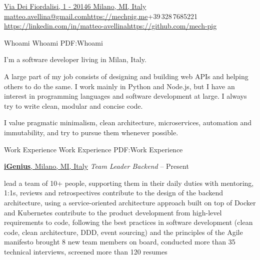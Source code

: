 \documentclass[a4paper,MMMyyyy,nonstopmode]{simpleresumecv}
\makeatletter
\renewcommand{\BulletSymbol}{{\normalfont\fontsize{6.5}{7.8}\selectfont\raisebox{0.17em}{\char"2022}}}
\newcommand{\CVAuthor}{Matteo Avellina}
\newcommand{\CVWebpage}{https://mechpig.me}
\newcommand{\CVGithub}{https://github.com/mech-pig}
\newcommand{\CVLinkedin}{https://linkedin.com/in/matteo-avellina}
\newcommand{\CVEmail}{matteo.avellina@gmail.com}
\newcommand{\CVMobile}{+39\,328\,7685221}
\makeatother
\begin{document}

  \Title{\CVAuthor}

  \begin{SubTitle}
    \href{https://www.google.com/maps/place/Via+dei+Fiordalisi,+1,+20146+Milano+MI}{Via Dei Fiordalisi, 1 - 20146 Milano, MI, Italy}
    \Gap
    \href{mailto:\CVEmail}{\CVEmail}\enspace\BulletSymbol\enspace\href{\CVWebpage}{\CVWebpage}\enspace\BulletSymbol\enspace\CVMobile
    \Gap
    \href{\CVLinkedin}{\CVLinkedin}\enspace\BulletSymbol\enspace\href{\CVGithub}{\CVGithub}
  \end{SubTitle}

  \begin{Body}

    \Section
    {Whoami}
    {Whoami}
    {PDF:Whoami}
    \begin{Detail}
      I'm a software developer living in Milan, Italy.
      \par
      A large part of my job consists of designing and building web APIs and helping others to do the same. I work mainly in Python and Node.js, but I have an interest in programming languages and software development at large. I always try to write clean, modular and concise code.
      \par
      I value pragmatic minimalism, clean architecture, microservices, automation and immutability, and try to pursue them whenever possible.
    \end{Detail}

    \Section
    {Work Experience}
    {Work Experience}
    {PDF:Work Experience}

      \Entry
        \href{https://igenius.ai}{\textbf{iGenius}, Milano, MI, Italy}
        \Gap
        \textit{Team Leader Backend}
          \hfill
           -- Present
        \Gap
        \begin{Detail}
          \Gap
          \BulletItem
            lead a team of 10+ people, supporting them in their daily duties with mentoring, 1:1s, reviews and retrospectives
          \BulletItem
            contribute to the design of the backend architecture, using a service-oriented architecture approach built on top of Docker and Kubernetes
          \BulletItem
            contribute to the product development from high-level requirements to code, following the best practices in software development (clean code, clean architecture, DDD, event sourcing) and the principles of the Agile manifesto
          \BulletItem
            brought 8 new team members on board, conducted more than 35 technical interviews, screened more than 120 resumes
        \end{Detail}


\end{Body}
\end{document}
